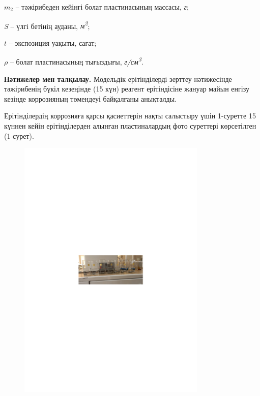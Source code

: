 \(m_{2}\) -- тәжірибеден кейінгі болат пластинасының массасы, \emph{г};

\emph{S} -- үлгі бетінің ауданы, \emph{м\textsuperscript{2}};

\(t\) -- экспозиция уақыты, сағат;

\(\rho\) -- болат пластинасының тығыздығы,
\emph{г/см\textsuperscript{3}}.

{\bfseries Нәтижелер мен талқылау.} Модельдік ерітінділерді зерттеу
нәтижесінде тәжірибенің бүкіл кезеңінде (15 күн) реагент ерітіндісіне
жануар майын енгізу кезінде коррозияның төмендеуі байқалғаны анықталды.

Ерітінділердің коррозияға қарсы қасиеттерін нақты салыстыру үшін
1-суретте 15 күннен кейін ерітінділерден алынған пластиналардың фото
суреттері көрсетілген (1-сурет).

\begin{figure}[H]
	\centering
	\includegraphics[width=0.8\textwidth]{media/gor/image22}
	\caption*{}
\end{figure}


